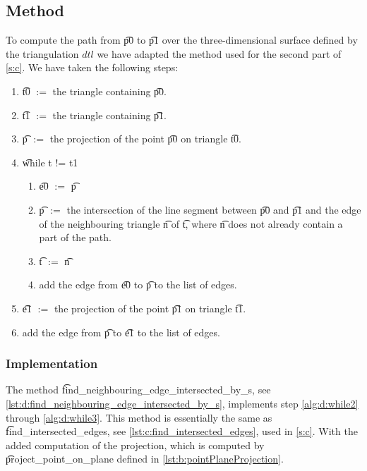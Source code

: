 \subsection*{Method}
	To compute the path from \t{p0} to \t{p1} over the three-dimensional surface defined by the triangulation $dtl$ we have adapted the method used for the second part of \autoref{s:c}. We have taken the following steps:
	\begin{enumerate}
		\item \label{alg:d:1} \t{t0} $:=$ the triangle containing \t{p0}.
		\item \label{alg:d:2} \t{t1} $:=$ the triangle containing \t{p1}.
		\item \label{alg:d:3} \t{p} $:=$ the projection of the point \t{p0} on triangle \t{t0}.
		\item \label{alg:d:4} \t{while t != t1}
			\begin{enumerate}
				\item \label{alg:d:while1} \t{e0} $:=$ \t{p}
				\item \label{alg:d:while2} \t{p} $:=$ the intersection of the line segment between \t{p0} and \t{p1} and the edge of the neighbouring triangle \t{n} of \t{t}, where \t{n} does not already contain a part of the path.
				\item \label{alg:d:while3} \t{t} $:=$ \t{n}
				\item \label{alg:d:while4} add the edge from \t{e0} to \t{p} to the list of edges.
			\end{enumerate}
		\item \label{alg:d:5} \t{e1} $:=$ the projection of the point \t{p1} on triangle \t{t1}.
		\item \label{alg:d:6} add the edge from \t{p} to \t{e1} to the list of edges.
	\end{enumerate}

	\subsubsection*{Implementation}
		The method \t{find_neighbouring_edge_intersected_by_s}, see \autoref{lst:d:find_neighbouring_edge_intersected_by_s}, implements step \autoref{alg:d:while2} through \autoref{alg:d:while3}. This method is essentially the same as \t{find_intersected_edges}, see \autoref{lst:c:find_intersected_edges}, used in \autoref{s:c}. With the added computation of the projection, which is computed by \t{project_point_on_plane} defined in \autoref{lst:b:pointPlaneProjection}.


